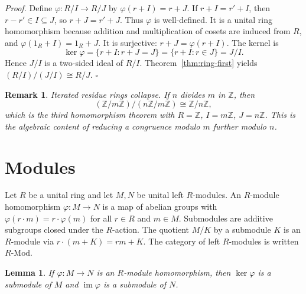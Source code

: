 \documentclass[11pt,letterpaper]{article}
\newcommand{\Z}{\mathbb{Z}}
\newcommand{\Map}[3]{#1 \colon #2 \to #3}
\newcommand{\Mod}[1]{#1\text{-}\mathrm{Mod}}
\newtheorem{lemma}[theorem]{Lemma}
\newtheorem{remark}[theorem]{Remark}
\newenvironment{proof}{\noindent\textit{Proof.}}{\hfill\(\square\)}
\begin{document}
\begin{proof}
Define \(\Map{\varphi}{R/I}{R/J}\) by \(\varphi(r+I)=r+J\). If \(r+I=r'+I\), then \(r-r'\in I\subseteq J\), so \(r+J=r'+J\). Thus \(\varphi\) is well-defined. It is a unital ring homomorphism because addition and multiplication of cosets are induced from \(R\), and \(\varphi(1_R+I)=1_R+J\). It is surjective: \(r+J=\varphi(r+I)\). The kernel is
\[
\ker\varphi=\{r+I:r+J=J\}=\{r+I:r\in J\}=J/I.
\]
Hence \(J/I\) is a two-sided ideal of \(R/I\). Theorem~\ref{thm:ring-first} yields \((R/I)/(J/I)\cong R/J\).
\end{proof}

\begin{center}
\end{center}

\begin{remark}
Iterated residue rings collapse. If \(n\) divides \(m\) in \(\Z\), then
\[
(\Z/m\Z)/(n\Z/m\Z)\cong\Z/n\Z,
\]
which is the third homomorphism theorem with \(R=\Z\), \(I=m\Z\), \(J=n\Z\). This is the algebraic content of reducing a congruence modulo \(m\) further modulo \(n\).
\end{remark}

\section{Modules}

Let \(R\) be a unital ring and let \(M,N\) be unital left \(R\)-modules. An \(R\)-module homomorphism \(\Map{\varphi}{M}{N}\) is a map of abelian groups with \(\varphi(r\cdot m)=r\cdot\varphi(m)\) for all \(r\in R\) and \(m\in M\). Submodules are additive subgroups closed under the \(R\)-action. The quotient \(M/K\) by a submodule \(K\) is an \(R\)-module via \(r\cdot(m+K)=rm+K\). The category of left \(R\)-modules is written \(\Mod{R}\).

\begin{lemma}
\label{lem:mod-kernel}
If \(\Map{\varphi}{M}{N}\) is an \(R\)-module homomorphism, then \(\ker\varphi\) is a submodule of \(M\) and \(\operatorname{im}\varphi\) is a submodule of \(N\).
\end{lemma}
\end{document}
